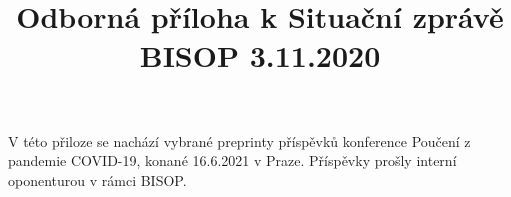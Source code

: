 \documentclass{book}
\begin{document}
\title{Odborná příloha k Situační zprávě BISOP 3.11.2020}



\maketitle

V této přiloze se nachází vybrané preprinty příspěvků konference Poučení z pandemie COVID-19, konané 16.6.2021 v Praze. Příspěvky prošly interní oponenturou v rámci BISOP.


%


%


%
%
%
%
%
%
%
%
%
%
%
%
%
%
%


%
% 



\printbibliography
\tableofcontents
\end{document}

